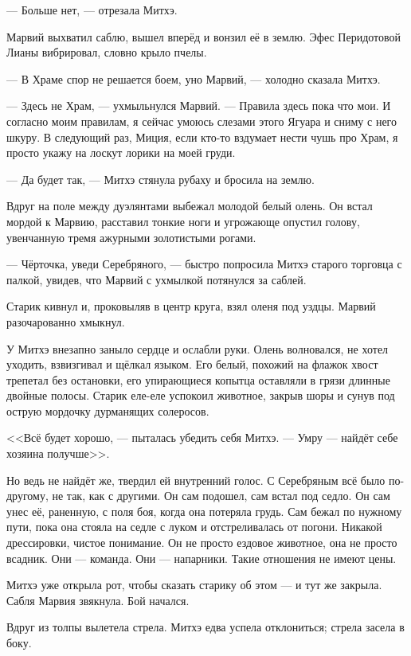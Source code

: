 --- Больше нет, --- отрезала Митхэ.

Марвий выхватил саблю, вышел вперёд и вонзил её в землю.
Эфес Перидотовой Лианы вибрировал, словно крыло пчелы.

--- В Храме спор не решается боем, уно Марвий, --- холодно сказала Митхэ.

--- Здесь не Храм, --- ухмыльнулся Марвий.
--- Правила здесь пока что мои.
И согласно моим правилам, я сейчас умоюсь слезами этого Ягуара и сниму с него шкуру.
В следующий раз, Миция, если кто-то вздумает нести чушь про Храм, я просто укажу на лоскут лорики на моей груди.

--- Да будет так, --- Митхэ стянула рубаху и бросила на землю.

\asterism

Вдруг на поле между дуэлянтами выбежал молодой белый олень.
Он встал мордой к Марвию, расставил тонкие ноги и угрожающе опустил голову, увенчанную тремя ажурными золотистыми рогами.

--- Чёрточка, уведи Серебряного, --- быстро попросила Митхэ старого торговца с палкой, увидев, что Марвий с ухмылкой потянулся за саблей.

Старик кивнул и, проковыляв в центр круга, взял оленя под уздцы.
Марвий разочарованно хмыкнул.

У Митхэ внезапно заныло сердце и ослабли руки.
Олень волновался, не хотел уходить, взвизгивал и щёлкал языком.
Его белый, похожий на флажок хвост трепетал без остановки, его упирающиеся копытца оставляли в грязи длинные двойные полосы.
Старик еле-еле успокоил животное, закрыв шоры и сунув под острую мордочку дурманящих солеросов.

<<Всё будет хорошо, --- пыталась убедить себя Митхэ.
--- Умру --- найдёт себе хозяина получше>>.

Но ведь не найдёт же, твердил ей внутренний голос.
С Серебряным всё было по-другому, не так, как с другими.
Он сам подошел, сам встал под седло.
Он сам унес её, раненную, с поля боя, когда она потеряла грудь.
Сам бежал по нужному пути, пока она стояла на седле с луком и отстреливалась от погони.
Никакой дрессировки, чистое понимание.
Он не просто ездовое животное, она не просто всадник.
Они --- команда.
Они --- напарники.
Такие отношения не имеют цены.

Митхэ уже открыла рот, чтобы сказать старику об этом --- и тут же закрыла.
Сабля Марвия звякнула.
Бой начался.

\asterism

Вдруг из толпы вылетела стрела.
Митхэ едва успела отклониться;
стрела засела в боку.

